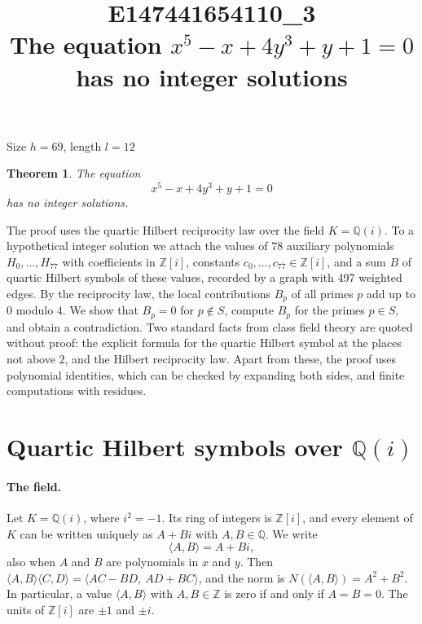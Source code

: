 \documentclass[11pt]{article}
\title{\textbf{E147441654110\_3}\\[4pt] {\Large The equation $x^{5}-x+4y^{3}+y+1=0$ has no integer solutions}}
\author{}
\date{}
\newtheorem{theorem}{Theorem}
\newcommand{\Z}{\mathbb{Z}}
\newcommand{\Q}{\mathbb{Q}}
\begin{document}
\maketitle
\vspace{-8ex}
\begin{center}
Size $h=69$, length $l=12$
\end{center}

\begin{theorem}\label{thm:main}
The equation
\begin{equation}\label{eq:main}
x^{5}-x+4y^{3}+y+1=0
\end{equation}
has no integer solutions.
\end{theorem}

The proof uses the quartic Hilbert reciprocity law over the field $K=\Q(i)$. To a hypothetical integer solution we attach the values of 78 auxiliary polynomials $H_0,\dots,H_{77}$ with coefficients in $\Z[i]$, constants $c_0,\dots,c_{77}\in\Z[i]$, and a sum $B$ of quartic Hilbert symbols of these values, recorded by a graph with 497 weighted edges. By the reciprocity law, the local contributions $B_p$ of all primes $p$ add up to $0$ modulo $4$. We show that $B_p=0$ for $p\notin S$, compute $B_p$ for the primes $p\in S$, and obtain a contradiction. Two standard facts from class field theory are quoted without proof: the explicit formula for the quartic Hilbert symbol at the places not above $2$, and the Hilbert reciprocity law. Apart from these, the proof uses polynomial identities, which can be checked by expanding both sides, and finite computations with residues.


\section{\texorpdfstring{Quartic Hilbert symbols over $\Q(i)$}{Quartic Hilbert symbols over Q(i)}}\label{sec:symbols}

\paragraph{The field.} Let $K=\Q(i)$, where $i^2=-1$. Its ring of integers is $\Z[i]$, and every element of $K$ can be written uniquely as $A+Bi$ with $A,B\in\Q$. We write
\[
\langle A,B\rangle=A+Bi,
\]
also when $A$ and $B$ are polynomials in $x$ and $y$. Then $\langle A,B\rangle\langle C,D\rangle=\langle AC-BD,\ AD+BC\rangle$, and the norm is $N(\langle A,B\rangle)=A^2+B^2$. In particular, a value $\langle A,B\rangle$ with $A,B\in\Z$ is zero if and only if $A=B=0$. The units of $\Z[i]$ are $\pm1$ and $\pm i$.
\end{document}

